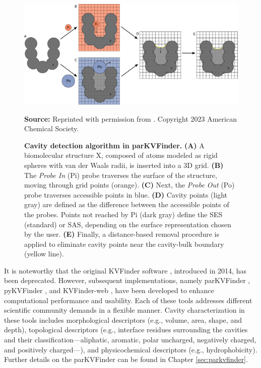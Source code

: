 \documentclass[Ingles]{phdthesis}
\def\eg{e.g.\onedot}
\begin{document}
\begin{figure}[ht]
  \centerline{\includegraphics[scale=0.8]{images/kvfinder-suite-schema.png}}
  \centerline{\tiny{\textbf{Source:} Reprinted with permission from \cite{guerra2023B}. Copyright 2023 American Chemical Society.}}
  \caption[Cavity detection algorithm in parKVFinder]{\textbf{Cavity detection algorithm in parKVFinder.} \textbf{(A)} A biomolecular structure X, composed of atoms modeled as rigid spheres with van der Waals radii, is inserted into a 3D grid. \textbf{(B)} The \textit{Probe In} (Pi) probe traverses the surface of the structure, moving through grid points (orange). \textbf{(C)} Next, the \textit{Probe Out} (Po) probe traverses accessible points in blue. \textbf{(D)} Cavity points (light gray) are defined as the difference between the accessible points of the probes. Points not reached by Pi (dark gray) define the SES (standard) or SAS, depending on the surface representation chosen by the user. \textbf{(E)} Finally, a distance-based removal procedure is applied to eliminate cavity points near the cavity-bulk boundary (yellow line).}
  \label{fig:parkvfinder-schema}
\end{figure}

It is noteworthy that the original KVFinder software \cite{oliveira2014}, introduced in 2014, has been deprecated. However, subsequent implementations, namely parKVFinder \cite{guerra2020}, pyKVFinder \cite{guerra2021}, and KVFinder-web \cite{guerra2023A}, have been developed to enhance computational performance and usability. Each of these tools addresses different scientific community demands in a flexible manner. Cavity characterization in these tools includes morphological descriptors (\eg, volume, area, shape, and depth), topological descriptors (\eg, interface residues surrounding the cavities and their classification---aliphatic, aromatic, polar uncharged, negatively charged, and positively charged---), and physicochemical descriptors (\eg, hydrophobicity). Further details on the parKVFinder can be found in Chapter \ref{sec:parkvfinder}.
\end{document}
